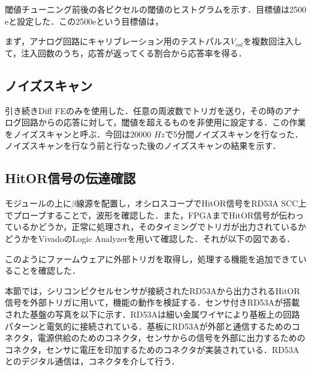 閾値チューニング前後の各ピクセルの閾値のヒストグラムを示す．目標値は2500$\mathrm{e}$と設定した．この2500$\mathrm{e}$という目標値は，



まず，アナログ回路にキャリブレーション用のテストパルス$V_{cal}$を複数回注入して，注入回数のうち，応答が返ってくる割合から応答率を得る．

\subsection{ノイズスキャン}
引き続きDiff FEのみを使用した．任意の周波数でトリガを送り，その時のアナログ回路からの応答に対して，閾値を超えるものを非使用に設定する．この作業をノイズスキャンと呼ぶ．今回は20000 $Hz$で5分間ノイズスキャンを行なった．ノイズスキャンを行なう前と行なった後のノイズスキャンの結果を示す．


\subsection{HitOR信号の伝達確認}
モジュールの上に$\beta$線源を配置し，オシロスコープでHitOR信号をRD53A SCC上でプローブすることで，波形を確認した．また，FPGAまでHitOR信号が伝わっているかどうか，正常に処理され，そのタイミングでトリガが出力されているかどうかをVivadoのLogic Analyzerを用いて確認した．それが以下の図である．



このようにファームウェアに外部トリガを取得し，処理する機能を追加できていることを確認した．



本節では，シリコンピクセルセンサが接続されたRD53Aから出力されるHitOR信号を外部トリガに用いて，機能の動作を検証する．センサ付きRD53Aが搭載された基盤の写真を以下に示す．RD53Aは細い金属ワイヤにより基板上の回路パターンと電気的に接続されている．基板にRD53Aが外部と通信するためのコネクタ，電源供給のためのコネクタ，センサからの信号を外部に出力するためのコネクタ，センサに電圧を印加するためのコネクタが実装されている．RD53Aとのデジタル通信は，コネクタを介して行う．



